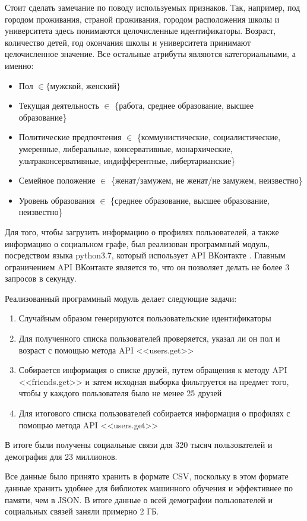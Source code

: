 Стоит сделать замечание по поводу используемых признаков. Так, например, под городом проживания, страной проживания, городом расположения школы и университета здесь понимаются целочисленные идентификаторы. Возраст, количество детей, год окончания школы и университета принимают целочисленное значение. Все остальные атрибуты являются категориальными, а именно:
\begin{itemize}
\item Пол $\in \{\text{мужской, женский}\}$
\item Текущая деятельность $\in$ \{работа, среднее образование, высшее образование\}
\item Политические предпочтения $\in$ \{коммунистические, социалистические, умеренные, либеральные, консервативные, монархические, ультраконсервативные, индифферентные, либертарианские\}
\item Семейное положение $\in$ \{женат/замужем, не женат/не замужем, неизвестно\}
\item Уровень образования $\in$ \{среднее образование, высшее образование, неизвестно\}
\end{itemize}


Для того, чтобы загрузить информацию о профилях пользователей, а также информацию о социальном графе,  был реализован программный модуль, посредством языка python3.7, который использует API ВКонтакте \cite{API VK}. Главным ограничением API ВКонтакте является то, что он позволяет делать не более 3 запросов в секунду.

Реализованный программный модуль делает следующие задачи:
\begin{enumerate}
\item Случайным образом генерируются пользовательские идентификаторы 
\item Для полученного списка пользователей проверяется, указал ли он пол и возраст с помощью метода API <<users.get>>
\item Собирается информация о списке друзей, путем обращения к методу API <<friends.get>> и затем исходная выборка фильтруется на предмет того, чтобы у каждого пользователя было не менее 25 друзей
\item Для итогового списка пользователей собирается информация о профилях с помощью метода API <<users.get>>
\end{enumerate}

В итоге были получены социальные связи для 320 тысяч пользователей и демография для 23 миллионов.

Все данные было принято хранить в формате CSV, поскольку в этом формате данные хранить удобнее для библиотек машинного обучения и эффективнее по памяти, чем в JSON.
В итоге данные о всей демографии пользователей и социальных связей заняли примерно 2 ГБ.

